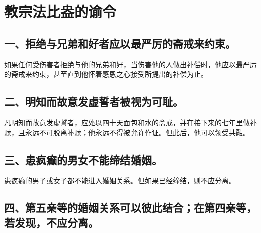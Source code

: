 
\section{教宗法比盎的谕令}

\par


\subsection{一、拒绝与兄弟和好者应以最严厉的斋戒来约束。}

如果任何受伤害者拒绝与他的兄弟和好，当伤害他的人做出补偿时，他应以最严厉的斋戒来约束，甚至直到他怀着感恩之心接受所提出的补偿为止。\par


\subsection{二、明知而故意发虚誓者被视为可耻。}

凡明知而故意发虚誓者，应处以四十天面包和水的斋戒，并在接下来的七年里做补赎，且永远不可脱离补赎；他永远不得被允许作证。但此后，他可以领受共融。\par


\subsection{三、患疯癫的男女不能缔结婚姻。}

患疯癫的男子或女子都不能进入婚姻关系。但如果已经缔结，则不应分离。\par


\subsection{四、第五亲等的婚姻关系可以彼此结合；在第四亲等，若发现，不应分离。}


